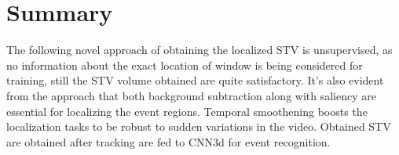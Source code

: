 \section{Summary}
The following novel approach of obtaining the localized STV is unsupervised, as no information about the exact location of window is being considered for training, still the STV volume obtained are quite satisfactory. It's also evident from the approach that both background subtraction along with saliency are essential for localizing the event regions. Temporal smoothening boosts the localization tasks to be robust to sudden variations in the video. Obtained STV are obtained after tracking are fed to CNN3d for event recognition.